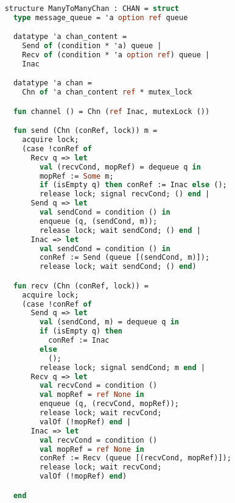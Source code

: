 \documentclass{article}
\begin{document}
  \begin{lstlisting}[language=ML, style=codestyle1]

    structure ManyToManyChan : CHAN = struct
      type message_queue = 'a option ref queue

      datatype 'a chan_content = 
        Send of (condition * 'a) queue | 
        Recv of (condition * 'a option ref) queue | 
        Inac

      datatype 'a chan =
        Chn of 'a chan_content ref * mutex_lock 

      fun channel () = Chn (ref Inac, mutexLock ())

      fun send (Chn (conRef, lock)) m = 
        acquire lock;
        (case !conRef of
          Recv q => let
            val (recvCond, mopRef) = dequeue q in
            mopRef := Some m;
            if (isEmpty q) then conRef := Inac else (); 
            release lock; signal recvCond; () end |
          Send q => let
            val sendCond = condition () in
            enqueue (q, (sendCond, m));
            release lock; wait sendCond; () end |
          Inac => let
            val sendCond = condition () in
            conRef := Send (queue [(sendCond, m)]);
            release lock; wait sendCond; () end)

      fun recv (Chn (conRef, lock)) =  
        acquire lock;
        (case !conRef of 
          Send q => let
            val (sendCond, m) = dequeue q in
            if (isEmpty q) then
              conRef := Inac
            else
              (); 
            release lock; signal sendCond; m end |
          Recv q => let
            val recvCond = condition ()
            val mopRef = ref None in
            enqueue (q, (recvCond, mopRef));
            release lock; wait recvCond;
            valOf (!mopRef) end |
          Inac => let
            val recvCond = condition ()
            val mopRef = ref None in
            conRef := Recv (queue [(recvCond, mopRef)]);
            release lock; wait recvCond;
            valOf (!mopRef) end)

      end

    \end{lstlisting}
\end{document}
